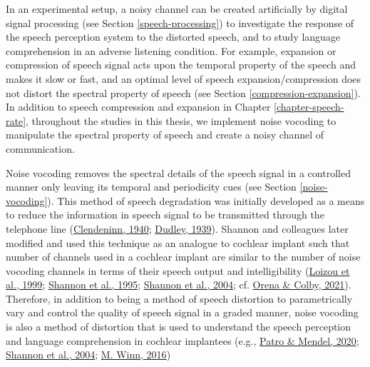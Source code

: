 \documentclass[a4paper, nobind]{templates/ociamthesis}
\begin{document}
In an experimental setup, a noisy channel can be created artificially by digital signal processing (see Section \ref{speech-processing}) to investigate the response of the speech perception system to the distorted speech,
and to study language comprehension in an adverse listening condition.
For example, expansion or compression of speech signal acts upon the temporal property of the speech and makes it slow or fast, and an optimal level of speech expansion/compression does not distort the spectral property of speech (see Section \ref{compression-expansion}).
In addition to speech compression and expansion in Chapter \ref{chapter-speech-rate},
throughout the studies in this thesis, we implement noise vocoding to manipulate the spectral property of speech and create a noisy channel of communication.

Noise vocoding removes the spectral details of the speech signal in a controlled manner only leaving its temporal and periodicity cues (see Section \ref{noise-vocoding}).
This method of speech degradation was initially developed as a means to reduce the information in speech signal to be transmitted through the telephone line (\protect\hyperlink{ref-Vocoder1940}{Clendeninn, 1940}; \protect\hyperlink{ref-Dudley1939}{Dudley, 1939}).
Shannon and colleagues later modified and used this technique as an analogue to cochlear implant such that number of channels used in a cochlear implant are similar to the number of noise vocoding channels in terms of their speech output and intelligibility (\protect\hyperlink{ref-Loizou1999}{Loizou et al., 1999}; \protect\hyperlink{ref-Shannon1995}{Shannon et al., 1995}; \protect\hyperlink{ref-Shannon2004}{Shannon et al., 2004}; cf. \protect\hyperlink{ref-Orena2021}{Orena \& Colby, 2021}).
Therefore, in addition to being a method of speech distortion to parametrically vary and control the quality of speech signal in a graded manner,
noise vocoding is also a method of distortion that is used to understand the speech perception and language comprehension in cochlear implantees (e.g., \protect\hyperlink{ref-Patro2020}{Patro \& Mendel, 2020}; \protect\hyperlink{ref-Shannon2004}{Shannon et al., 2004}; \protect\hyperlink{ref-Winn2016}{M. Winn, 2016})
\end{document}
